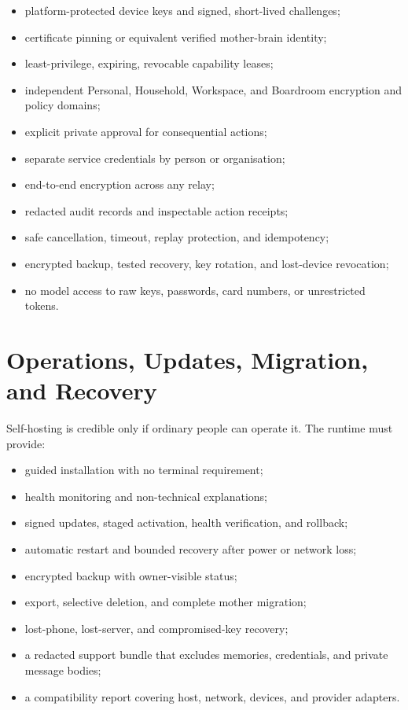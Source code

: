 \documentclass[11pt,a4paper]{article}
\begin{document}
\begin{itemize}[leftmargin=*]
  \item platform-protected device keys and signed, short-lived challenges;
  \item certificate pinning or equivalent verified mother-brain identity;
  \item least-privilege, expiring, revocable capability leases;
  \item independent Personal, Household, Workspace, and Boardroom encryption and policy domains;
  \item explicit private approval for consequential actions;
  \item separate service credentials by person or organisation;
  \item end-to-end encryption across any relay;
  \item redacted audit records and inspectable action receipts;
  \item safe cancellation, timeout, replay protection, and idempotency;
  \item encrypted backup, tested recovery, key rotation, and lost-device revocation;
  \item no model access to raw keys, passwords, card numbers, or unrestricted tokens.
\end{itemize}

\section{Operations, Updates, Migration, and Recovery}

Self-hosting is credible only if ordinary people can operate it.  The runtime
must provide:

\begin{itemize}[leftmargin=*]
  \item guided installation with no terminal requirement;
  \item health monitoring and non-technical explanations;
  \item signed updates, staged activation, health verification, and rollback;
  \item automatic restart and bounded recovery after power or network loss;
  \item encrypted backup with owner-visible status;
  \item export, selective deletion, and complete mother migration;
  \item lost-phone, lost-server, and compromised-key recovery;
  \item a redacted support bundle that excludes memories, credentials, and private message bodies;
  \item a compatibility report covering host, network, devices, and provider adapters.
\end{itemize}
\end{document}
